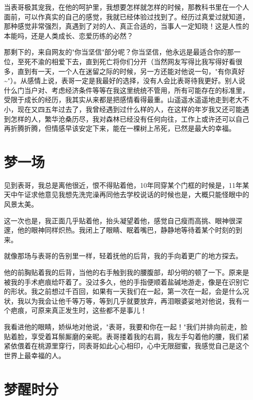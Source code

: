 \documentclass[12pt]{book}
\begin{document}
当表哥极其宠我，在他的呵护里，我想要怎样就怎样的时候，那教科书里在一个人面前，可以作真实的自己的感觉，我就已经体验过找到了。经历过真爱过就知道，那种感觉非常强烈，真遇到了对的人、真正合适的，当事人一定知晓！这是人性的本能吗，还是人类成长、恋爱历练的必然？

那剩下的，来自网友的"你当坚信"部分呢？你当坚信，他永远是最适合你的那一位，至死不渝的相爱下去，直到死亡将你们分开（当然网友写得比我写得好看很多，直到有一天，一个人在迷留之际的时候，另一方还能对他说一句，"有你真好\textasciitilde{}"）。从感情上说，表哥一定是我最好的选择，没有人会比表哥待我更好。别人说什么门当户对、考虑经济条件等等在我这里统统不管用，所有可能存在的标准里，受限于成长的经历，我其实从来都是把感情看得最重。山遥遥水遥遥地走到老大不小，现在又四五年过去了，我曾经遇到过什么样的人，在这样的年岁我又还可能遇到怎样的人，繁华沧桑历尽，我对森林已经没有任何向往，工作上或许还可以自己再折腾折腾，但情感早该安定下来，能在一棵树上吊死，已然是最大的幸福。

\chapter{梦一场}
\label{sec-5}

见到表哥，我总是离他很近，恨不得贴着他，10年同穿某个门框的时候是，11年某天中午证求他意见我想先洗完澡再同他去学校说话的时候也是，大概只能怪眼中的风景太美。

这一次也是，我正面几乎贴着他，抬头凝望着他，感觉自己瘦而高挑、眼神很深邃，他的眼神同样炽热。我闭上了眼睛、眠着嘴巴，静静地等待着某个时刻的到来。

就像那场与表哥的告别里一样，轻着抚他的后背，我的手向着更广的地方探去。

他的前胸贴着我的后背，当他的右手触到我的腰腹部，却分明的顿了一下。原来是被我的手术疤痕给吓着了。没过多久，他的手指便顺着盐碱地游走，像是在识别它的形状。我之前想过千百回，如果有一天我们在一起，第一次在一起，会是什么况状，我以为我会让他千等万等，等到几乎就要放弃，再泪眼婆娑地对他说，我有一个疤痕，可原来真正发生时，这些都不是事儿！

我看进他的眼睛，娇纵地对他说，"表哥，我要和你在一起！"我们并排向前走，脸贴着脸，享受着耳鬃厮磨的亲昵。表哥搂着我的右肩，我左手勾着他的腰，我们紧紧依偎着在桃源里穿行，同表哥如此心心相印，心中无限甜蜜，我感觉自己是这个世界上最幸福的人。

\chapter{梦醒时分}
\label{sec-6}
\end{document}
